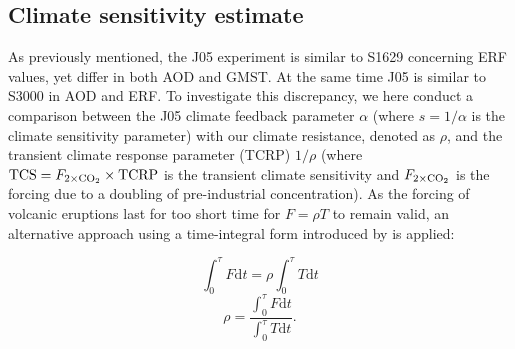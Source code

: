 \documentclass[draft]{agujournal2019}
\begin{document}

  \subsection{Climate sensitivity estimate}

  As previously mentioned, the J05 experiment is similar to S1629 concerning ERF values,
  yet differ in both AOD and GMST. At the same time J05 is similar to S3000 in AOD and
  ERF. To investigate this discrepancy, we here conduct a comparison between the J05
  climate feedback parameter \(\alpha\) (where \(s=1/\alpha\) is the climate sensitivity
  parameter) with our climate resistance, denoted as \(\rho\), and the transient climate
  response parameter (TCRP) \(1/\rho\) (where \(\mathrm{TCS}=F_{2\times\ce{CO2}}\times
  \mathrm{TCRP}\) is the transient climate sensitivity and \(F_{2\times\ce{CO2}}\) is
  the forcing due to a doubling of pre-industrial  concentration).
  As the forcing of volcanic eruptions last for too short time
  for \(F=\rho T\) to remain valid, an alternative approach using a time-integral form
  introduced by  is applied:

  \begin{equation}
    \int_0^{\tau}F \mathrm{d}t=\rho\int_{0}^{\tau}T \mathrm{d}t
    \label{eq:climate-resistance-orig}
  \end{equation}
  \begin{equation}
    \rho=\frac{\int_0^{\tau}F \mathrm{d}t}{\int_{0}^{\tau}T \mathrm{d}t}.
    \label{eq:climate-resistance}
  \end{equation}
\end{document}
